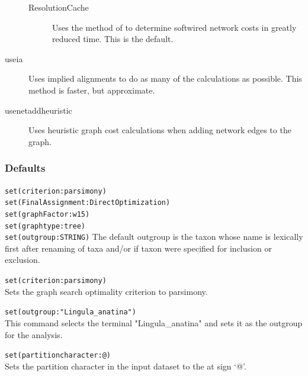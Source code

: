 \begin{description}
\begin{description}
			\item[ResolutionCache] Uses the method of \citep{WheelerandWashburn2023} to 
			determine softwired network costs in greatly reduced time.  This is the default.
			
		\end{description}
		

		\item[useia] Uses implied alignments to do as many of the calculations as possible.
		This method is faster, but approximate. 
		
		\item[usenetaddheuristic]	Uses heuristic graph cost calculations when adding network
		edges to the graph.
		
	\end{description}
					
	\subsubsection{Defaults} 
		\texttt{set(criterion:parsimony)}\\
		\texttt{set(FinalAssignment:DirectOptimization)} \\
		\texttt{set(graphFactor:w15)} \\
		\texttt{set(graphtype:tree)}\\
		\texttt{set(outgroup:STRING)} The default outgroup is the taxon whose name is 
		lexically first after renaming of taxa and/or if taxon were specified for inclusion or
		exclusion. 
		
		
	\begin{example}
	
		\item{\texttt{set(criterion:parsimony)}\\Sets the graph search optimality criterion to 
		parsimony.}

		\item{\texttt{set(outgroup:"Lingula\_anatina")}\\This command selects the terminal 
		"Lingula\_anatina" and sets it as the outgroup for the analysis.}
		
		\item{\texttt{set(partitioncharacter:@)}\\Sets the partition character in the input dataset 
		to the at sign `@'.}
		

	\end{example}

